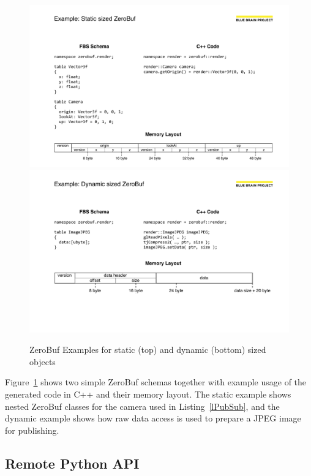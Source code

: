 \documentclass[10pt]{llncs}
\newcommand{\lref}[1]{Listing~\ref{#1}}
\newcommand{\fig}[1]{Figure~\ref{#1}}
\begin{document}
\begin{figure}[ht]\center
  \includegraphics[width=\columnwidth]{images/ZeroBufStatic}\\\vspace{4ex}
  \includegraphics[width=\columnwidth]{images/ZeroBufDynamic}
  \caption{\label{fZeroBuf}ZeroBuf Examples for static (top) and dynamic
(bottom) sized objects}
\end{figure}

\fig{fZeroBuf} shows two simple ZeroBuf schemas together with example usage of
the generated code in C++ and their memory layout. The static example shows
nested ZeroBuf classes for the camera used in \lref{lPubSub}, and the dynamic
example shows how raw data access is used to prepare a JPEG image for
publishing.

\subsection{Remote Python API}
\end{document}
